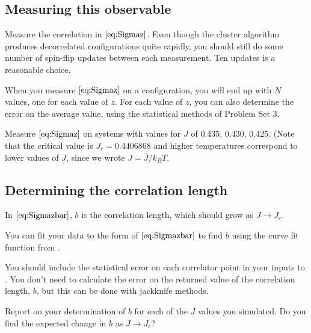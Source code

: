 \subsection{Measuring this observable}

Measure the correlation in \(\eqref{eq:Sigmaz}\). Even
though the cluster algorithm produces decorrelated configurations quite rapidly, you should
still do some number of spin-flip updates between each measurement. Ten updates is a
reasonable choice.

When you measure \(\eqref{eq:Sigmaz}\) on a configuration, you will end up with \(N\)
values, one for each value of \(z\). For each value of \(z\), you can also determine the
error on the average value, using the statistical methods of Problem Set 3.

\Question{} Measure \(\eqref{eq:Sigmaz}\) on systems with values for \(J\) of \(0.435\),
\(0.430\), \(0.425\). (Note that the critical value is \(J_c = 0.4406868\) and higher
temperatures correspond to lower values of \(J\), since we wrote \(J = \bar{J} / k_B T\).

\subsection{Determining the correlation length}

In \(\eqref{eq:Sigmazbar}\), \(b\) is the correlation length, which should grow as
\(J \rightarrow J_c\).

\Question{} You can fit your data to the form of \(\eqref{eq:Sigmazbar}\) to find \(b\)
using the curve fit function  from
\href{https://github.com/JuliaNLSolvers/LsqFit.jl}{}.

You should include the statistical error on each correlator point in your inputs to
.
You don't need to calculate the error on the returned value of the correlation length,
\(b\), but this can be done with jackknife methods.


\Question{} Report on your determination of \(b\) for each of the \(J\) values you
simulated. Do you find the expected change in \(b\) as \(J \rightarrow J_c\)?
